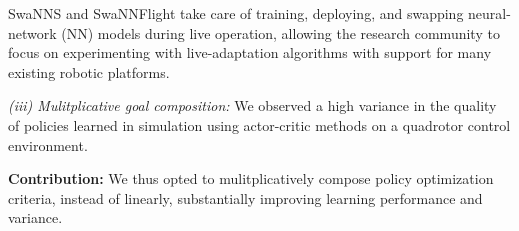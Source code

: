 \documentclass[letterpaper, 10 pt, conference]{ieeeconf} %
\newcommand{\firmware}{SwaNNFlight}
\newcommand{\framework}{SwaNNS}
\begin{document}
    \framework{} and \firmware{} take care of training, deploying, and swapping neural-network (NN) models during live operation, allowing the research community to focus on experimenting with live-adaptation algorithms with support for many existing robotic platforms.
    
    \textit{(iii) Mulitplicative goal composition:} We observed a high variance in the quality of policies learned in simulation using actor-critic methods on a quadrotor control environment.
    
    \noindent\textbf{Contribution:} We thus opted to mulitplicatively compose policy optimization criteria, instead of linearly, substantially improving learning performance and variance.
    



\end{document}
